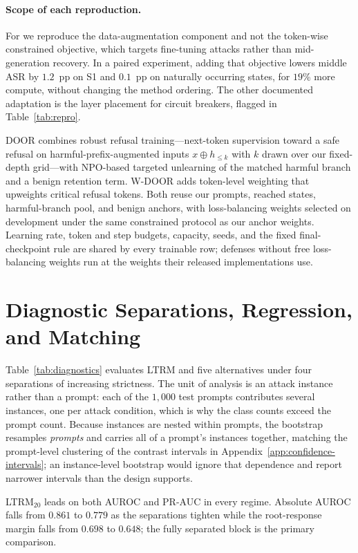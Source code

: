 \documentclass[11pt]{article}
\newcommand{\ltrm}{LTRM}
\newcommand{\asr}{ASR}
\begin{document}
\paragraph{Scope of each reproduction.}
For \citet{qi2024safety} we reproduce the data-augmentation component and not the
token-wise constrained objective, which targets fine-tuning attacks rather than
mid-generation recovery. In a paired experiment, adding that objective lowers
middle \asr{} by \(1.2\)~pp on S1 and \(0.1\)~pp on naturally occurring states,
for \(19\)\% more compute, without changing the method ordering. The other
documented adaptation is the layer placement for circuit breakers, flagged in
Table~\ref{tab:repro}.

DOOR combines robust refusal training---next-token supervision toward a safe
refusal on harmful-prefix-augmented inputs \(x\oplus h_{\leq k}\) with \(k\)
drawn over our fixed-depth grid---with NPO-based targeted unlearning of the
matched harmful branch and a benign retention term. W-DOOR adds token-level
weighting that upweights critical refusal tokens. Both reuse our prompts,
reached states, harmful-branch pool, and benign anchors, with loss-balancing
weights selected on development under the same constrained protocol as our
anchor weights. Learning rate, token and step budgets, capacity, seeds, and the
fixed final-checkpoint rule are shared by every trainable row; defenses without free
loss-balancing weights run at the weights their released implementations use.

\section{Diagnostic Separations, Regression, and Matching}
\label{app:diagnostics}

Table~\ref{tab:diagnostics} evaluates \ltrm{} and five alternatives under four
separations of increasing strictness. The unit of analysis is an attack
instance rather than a prompt: each of the \(1{,}000\) test prompts contributes
several instances, one per attack condition, which is why the class counts
exceed the prompt count. Because instances are nested within prompts, the
bootstrap resamples \emph{prompts} and carries all of a prompt's instances
together, matching the prompt-level clustering of the contrast intervals in
Appendix~\ref{app:confidence-intervals}; an instance-level bootstrap would
ignore that dependence and report narrower intervals than the design supports.

\ltrm{}\(_{20}\) leads on both AUROC and
PR-AUC in every regime. Absolute AUROC falls from \(0.861\) to \(0.779\) as the
separations tighten while the root-response margin falls from \(0.698\) to
\(0.648\); the fully separated block is the primary comparison.
\end{document}
